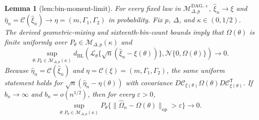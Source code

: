 \documentclass{article}
\newtheorem{lemma}{Lemma}
\begin{document}
\begin{lemma}[lem:bin-moment-limit]\label{lem:bin-moment-limit}
For every fixed law in \(\mathcal M_{\Delta,p}^{\mathrm{DAG},+}\), \(\widehat\xi_n\to\xi\) and \(\widehat\eta_n=\mathcal C(\widehat\xi_n)\to\eta=(m,\Gamma_1,\Gamma_2)\) in probability. Fix \(p\), \(\Delta\), and \(\kappa\in(0,1/2)\). The derived geometric-mixing and sixteenth-bin-count bounds imply that \(\Omega(\theta)\) is finite uniformly over \(P_{\theta}\in\mathcal M_{\Delta,p}(\kappa)\) and \[\sup_{\theta:P_{\theta}\in\mathcal M_{\Delta,p}(\kappa)}d_{\mathrm{BL}}\left(\mathcal L_{\theta}\{\sqrt n(\widehat\xi_n-\xi(\theta))\},\mathcal N\{0,\Omega(\theta)\}\right)\longrightarrow0.\] Because \(\widehat\eta_n=\mathcal C(\widehat\xi_n)\) and \(\eta=\mathcal C(\xi)=(m,\Gamma_1,\Gamma_2)\), the same uniform statement holds for \(\sqrt n(\widehat\eta_n-\eta(\theta))\) with covariance \(D\mathcal C_{\xi(\theta)}\Omega(\theta)D\mathcal C_{\xi(\theta)}^{\mathsf T}\). If \(b_n\to\infty\) and \(b_n=o(n^{1/2})\), then for every \(\varepsilon>0\), \[\sup_{\theta:P_{\theta}\in\mathcal M_{\Delta,p}(\kappa)}P_{\theta}\{\lVert\widehat\Omega_n-\Omega(\theta)\rVert_{\mathrm{op}}>\varepsilon\}\longrightarrow0.\]
\end{lemma}
\end{document}
